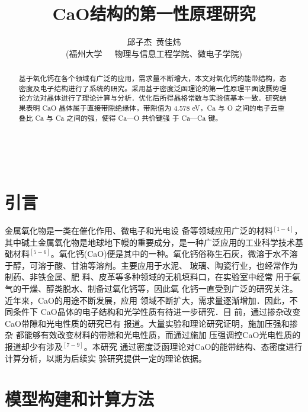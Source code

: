 \documentclass[12pt,a4paper]{article}%
\title{\fontsize{18pt}{27pt}\selectfont%
	{\heiti%
	CaO结构的第一性原理研究}}%
\author{\fontsize{12pt}{18pt}\selectfont%
	{\fangsong%
		邱子杰~黄佳炜}\\%
	\fontsize{10.5pt}{15.75pt}\selectfont%
	{\fangsong%
		(福州大学~~~物理与信息工程学院、微电子学院)}}%
\date{}%
\begin{document}
	\maketitle%
	\lhead{}%
	\chead{}%
	\rhead{}%
	\lfoot{}%
	\cfoot{\thepage}%
	\rfoot{}%
	\begin{abstract}
		\fangsong 基于氧化钙在各个领域有广泛的应用，需求量不断增大，本文对氧化钙的能带结构，态密度及电子结构进行了系统的研究。采用基于密度泛函理论的第一性原理平面波赝势理
		论方法对晶体进行了理论计算与分析．优化后所得晶格常数与实验值基本一致．研究结果表明 CaO 晶体属于直接带隙绝缘体，带隙值为 4.578 eV，Ca 与 O 之间的电子云重叠比 Ca 与 Ca 之间的强，使得 Ca—O 共价键强
		于 Ca—Ca 键。
	\end{abstract}
	
	\begin{adjustwidth}{1.06cm}{1.06cm}
		\fontsize{10.5pt}{15.75pt}\\
	\end{adjustwidth}
	\section{引言}
	金属氧化物是一类在催化作用、微电子和光电设
	备等领域应用广泛的材料$^{[1-4]}$，其中碱土金属氧化物是地球地下幔的重要成分，是一种广泛应用的工业科学技术基础材料$^{[5-6]}$。氧化钙(CaO)便是其中的一种。氧化钙俗称生石灰，微溶于水不溶于醇，可溶于酸、甘油等溶剂。主要应用于水泥、
	玻璃、陶瓷行业，也经常作为制药、非铁金属、肥
	料、皮革等多种领域的无机填料口，在实验室中经常
	用于氨气的干燥、醇类脱水、制备过氧化钙等，因此氧
	化钙一直受到广泛的研究关注。近年来，CaO的用途不断发展，应用
	领域不断扩大，需求量逐渐增加．因此，不同条件下
	CaO晶体的电子结构和光学性质有待进一步研究．目
	前，通过掺杂改变CaO带隙和光电性质的研究已有
	报道。大量实验和理论研究证明，施加压强和掺杂
	都能够有效改变材料的带隙和光电性质，而通过施加
	压强调控CaO光电性质的报道却少有涉及$^{[7-9]}$。本研究
	通过密度泛函理论对CaO的能带结构、态密度进行计算分析，以期为后续实
	验研究提供一定的理论依据。
	\section{模型构建和计算方法}
\end{document}

